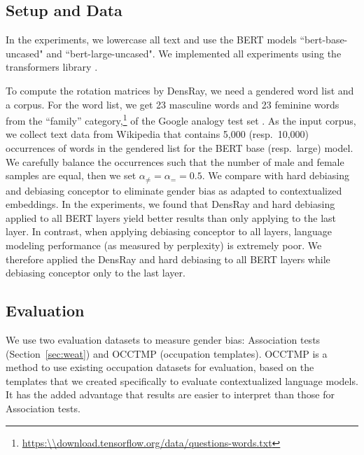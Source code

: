 \subsection{Setup and Data}
In the experiments, we lowercase all text and use the BERT models ``bert-base-uncased" and ``bert-large-uncased". We implemented all experiments using the transformers library \cite{wolf2019huggingfaces}.

To compute the rotation matrices by DensRay, we need a gendered word list and a corpus. For the word list, we get 23 masculine words and 23 feminine words from
the ``family'' category,\footnote{\url{https:\\download.tensorflow.org/data/questions-words.txt}}
of the Google analogy test set \cite{mikolov2013efficient}. As the input corpus, we collect text data from Wikipedia that contains 5,000 (resp.\ 10,000)
occurrences of words in the gendered list for the BERT base
(resp.\ large) model. We carefully balance the occurrences such that the number of male and female samples are equal, then we set  $\alpha_{\neq}=\alpha_{=}=0.5$. We compare with hard debiasing \cite{mu2018all} and debiasing conceptor \cite{karve2019conceptor} to eliminate gender bias as adapted to contextualized embeddings. In the experiments, we found that DensRay and hard debiasing applied to all BERT layers yield better results than only applying to the last layer. In contrast, when applying debiasing conceptor to all layers, language modeling performance (as measured by perplexity) is extremely poor.
We therefore applied the DensRay and hard debiasing to all BERT layers while debiasing conceptor only to the last layer.

\subsection{Evaluation}
We use two evaluation datasets to measure gender bias: Association tests (Section~\ref{sec:weat}) and OCCTMP (occupation templates). OCCTMP is a method to use existing occupation datasets for evaluation, based on the templates that we created specifically to evaluate contextualized language models.  It has the added advantage that results are easier to interpret than those for Association tests.

